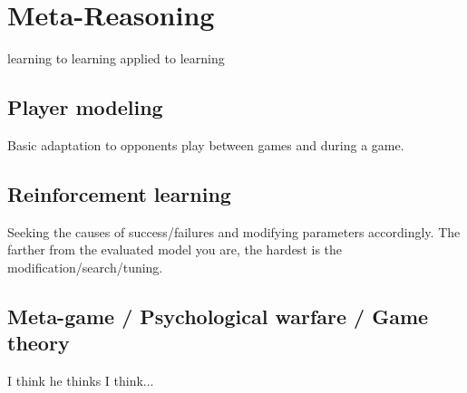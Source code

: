 \chapter{Meta-Reasoning}
learning to learning applied to learning

\section{Player modeling}
Basic adaptation to opponents play between games and during a game.

\section{Reinforcement learning}
Seeking the causes of success/failures and modifying parameters accordingly. The farther from the evaluated model you are, the hardest is the modification/search/tuning.

\section{Meta-game / Psychological warfare / Game theory}
I think he thinks I think...


